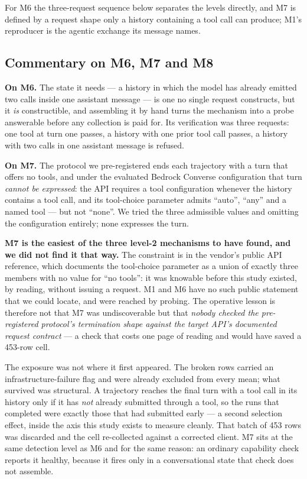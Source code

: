 For M6 the three-request sequence below separates the levels directly, and M7 is defined by a request
shape only a history containing a tool call can produce; M1's reproducer is the agentic exchange its
message names.

\subsection{Commentary on M6, M7 and M8}

\textbf{On M6.} The state it needs --- a history in which the model has already emitted two calls inside
one assistant message --- is one no single request constructs, but it \emph{is} constructible, and
assembling it by hand turns the mechanism into a probe answerable before any collection is paid for. Its
verification was three requests: one tool at turn one passes, a history with one prior tool call passes, a
history with two calls in one assistant message is refused.

\textbf{On M7.} The protocol we pre-registered ends each trajectory with a turn that offers no tools, and
under the evaluated Bedrock Converse configuration that turn \emph{cannot be expressed}: the API requires a
tool configuration whenever the history contains a tool call, and its tool-choice parameter admits
``auto'', ``any'' and a named tool --- but not ``none''. We tried the three admissible values and omitting
the configuration entirely; none expresses the turn.

\textbf{M7 is the easiest of the three level-2 mechanisms to have found, and we did not find it that
way.} The constraint is in the vendor's public API reference, which documents the tool-choice parameter as
a union of exactly three members with no value for ``no tools'': it was knowable before this study existed,
by reading, without issuing a request. M1 and M6 have no such public statement that we could locate, and
were reached by probing. The operative lesson is therefore not that M7 was undiscoverable but that
\emph{nobody checked the pre-registered protocol's termination shape against the target API's documented
request contract} --- a check that costs one page of reading and would have saved a 453-row cell.

The exposure was not where it first appeared. The broken rows carried an infrastructure-failure flag and
were already excluded from every mean; what survived was structural. A trajectory reaches the final turn
with a tool call in its history only if it has \emph{not} already submitted through a tool, so the runs
that completed were exactly those that had submitted early --- a second selection effect, inside the axis
this study exists to measure cleanly. That batch of 453 rows was discarded and the cell re-collected against
a corrected client. M7 sits at the same detection level as M6 and for the same reason: an ordinary
capability check reports it healthy, because it fires only in a conversational state that check does not
assemble.

